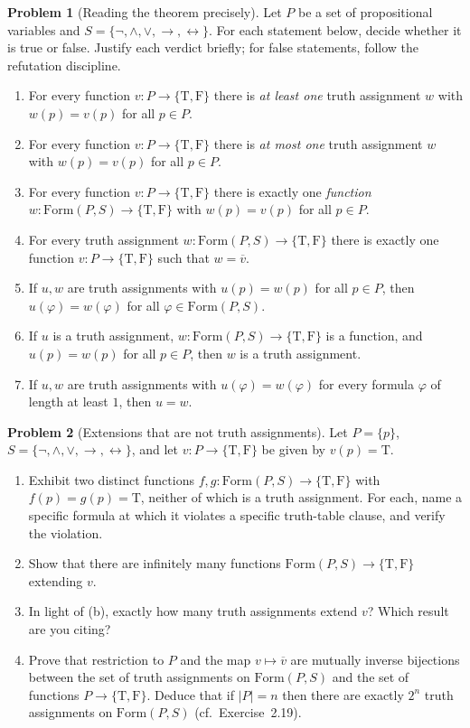 \documentclass[11pt]{article}
\newcommand{\Form}{\mathrm{Form}}
\newcommand{\T}{\mathrm{T}}
\newcommand{\F}{\mathrm{F}}
\newcommand{\TF}{\{\T,\F\}}
\newcommand{\ext}[1]{\overline{#1}}
\newcommand{\Sfive}{\{\lnot,\land,\lor,\to,\leftrightarrow\}}
\theoremstyle{definition}
\newtheorem{problem}{Problem}
\begin{document}
\begin{problem}[Reading the theorem precisely]
Let $P$ be a set of propositional variables and $S = \Sfive$. For each statement
below, decide whether it is true or false. Justify each verdict briefly; for false
statements, follow the refutation discipline.
\begin{enumerate}
\item[(a)] For every function $v\colon P\to\TF$ there is \emph{at least one} truth
assignment $w$ with $w(p)=v(p)$ for all $p\in P$.
\item[(b)] For every function $v\colon P\to\TF$ there is \emph{at most one} truth
assignment $w$ with $w(p)=v(p)$ for all $p\in P$.
\item[(c)] For every function $v\colon P\to\TF$ there is exactly one
\emph{function} $w\colon\Form(P,S)\to\TF$ with $w(p)=v(p)$ for all $p\in P$.
\item[(d)] For every truth assignment $w\colon\Form(P,S)\to\TF$ there is exactly
one function $v\colon P\to\TF$ such that $w=\ext{v}$.
\item[(e)] If $u,w$ are truth assignments with $u(p)=w(p)$ for all $p\in P$, then
$u(\varphi)=w(\varphi)$ for all $\varphi\in\Form(P,S)$.
\item[(f)] If $u$ is a truth assignment, $w\colon\Form(P,S)\to\TF$ is a function,
and $u(p)=w(p)$ for all $p\in P$, then $w$ is a truth assignment.
\item[(g)] If $u,w$ are truth assignments with $u(\varphi)=w(\varphi)$ for every
formula $\varphi$ of length at least $1$, then $u=w$.
\end{enumerate}
\end{problem}

\begin{problem}[Extensions that are not truth assignments]
Let $P=\{p\}$, $S=\Sfive$, and let $v\colon P\to\TF$ be given by $v(p)=\T$.
\begin{enumerate}
\item[(a)] Exhibit two distinct functions $f,g\colon\Form(P,S)\to\TF$ with
$f(p)=g(p)=\T$, neither of which is a truth assignment. For each, name a specific
formula at which it violates a specific truth-table clause, and verify the
violation.
\item[(b)] Show that there are infinitely many functions
$\Form(P,S)\to\TF$ extending $v$.
\item[(c)] In light of (b), exactly how many truth assignments extend $v$? Which
result are you citing?
\item[(d)] Prove that restriction to $P$ and the map $v\mapsto\ext{v}$ are
mutually inverse bijections between the set of truth assignments on $\Form(P,S)$
and the set of functions $P\to\TF$. Deduce that if $|P|=n$ then there are exactly
$2^n$ truth assignments on $\Form(P,S)$ (cf.\ Exercise~2.19).
\end{enumerate}
\end{problem}
\end{document}
